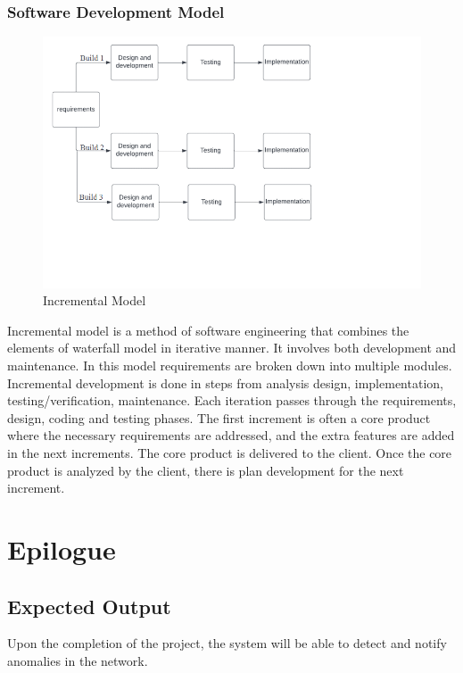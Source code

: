 \subsection{Software Development Model}
\vspace{-18pt}
 \begin{figure}[tbh] %
\begin{center}
	\includegraphics[width=8in]{images/sdlc1.png} 
	\caption{Incremental Model} %
	\label{Incremental Model} %
\end{center}
\end{figure}
Incremental model is a method of software engineering that combines the elements of waterfall model in iterative manner. It involves both development and maintenance. In this model requirements are broken down into multiple modules. Incremental development is done in steps from analysis design, implementation, testing/verification, maintenance. Each iteration passes through the requirements, design, coding and testing phases. The first increment is often a core product where the necessary requirements are addressed, and the extra features are added in the next increments. The core product is delivered to the client. Once the core product is analyzed by the client, there is plan development for the next increment.\\
\chapter{Epilogue}
\vspace{-18pt}
\section{Expected Output}
\vspace{-18pt}
Upon the completion of the project, the system will be able to detect and notify anomalies in the network.
\renewcommand\bibname{REFERENCES} %

